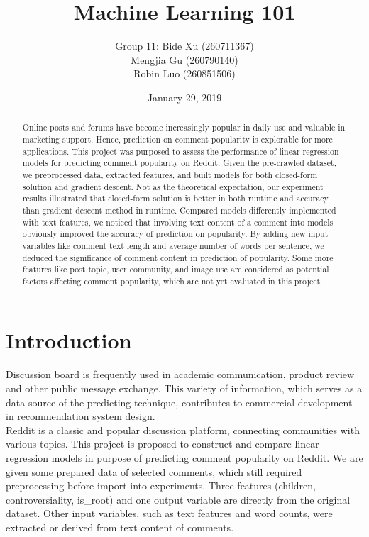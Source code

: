 \documentclass[letterpaper, 12pt]{article}
\title{\Huge Machine Learning 101}
\author{Group 11: Bide Xu (260711367)\\Mengjia Gu (260790140)\\Robin Luo (260851506)}
\date{\normalsize January 29, 2019}
\begin{document}
\begin{titlingpage}
\maketitle
\end{titlingpage}

\newpage
\begin{abstract}

Online posts and forums have become increasingly popular in daily use and valuable in marketing support. Hence, prediction on comment popularity is explorable for more applications. This project was purposed to assess the performance of linear regression models for predicting comment popularity on Reddit. Given the pre-crawled dataset, we preprocessed data, extracted features, and built models for both closed-form solution and gradient descent. Not as the theoretical expectation, our experiment results illustrated that closed-form solution is better in both runtime and accuracy than gradient descent method in runtime. Compared models differently implemented with text features, we noticed that involving text content of a comment into models obviously improved the accuracy of prediction on popularity. By adding new input variables like comment text length and average number of words per sentence, we deduced the significance of comment content in prediction of popularity. Some more features like post topic, user community, and image use are considered as potential factors affecting comment popularity, which are not yet evaluated in this project.
\end{abstract}

\section*{Introduction}

Discussion board is frequently used in academic communication, product review and other public message exchange. This variety of information, which serves as a data source of the predicting technique, contributes to commercial development in recommendation system design. \cite{rohlin}\\

Reddit is a classic and popular discussion platform, connecting communities with various topics. \cite{reddit} This project is proposed to construct and compare linear regression models in purpose of predicting comment popularity on Reddit. We are given some prepared data of selected comments, which still required preprocessing before import into experiments. Three features (children, controversiality, is\_root) and one output variable are directly from the original dataset. Other input variables, such as text features and word counts, were extracted or derived from text content of comments.\\
\end{document}
